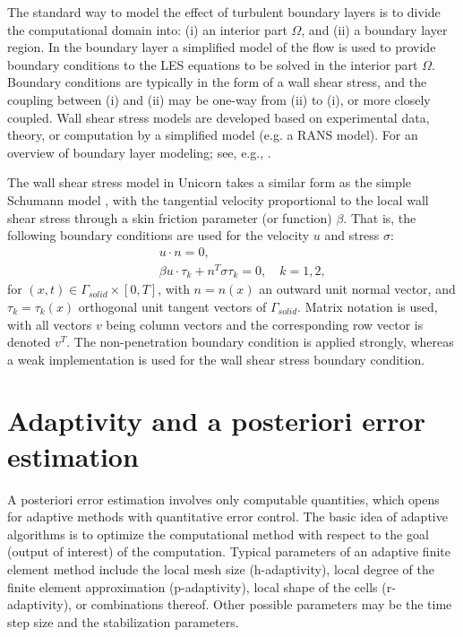The standard way to model the effect of turbulent boundary layers is to divide the computational domain into: (i) an interior part $\Omega$, and (ii) a boundary layer region. In the boundary layer a simplified model of the flow is used to provide boundary conditions to the LES equations to be solved in the interior part $\Omega$. Boundary conditions are typically in the form of a wall shear stress, and the coupling between (i) and (ii) may be one-way from (ii) to (i), or more closely coupled. Wall shear stress models are developed based on experimental data, theory, or computation by a simplified model (e.g. a RANS model). For an overview of boundary layer modeling; see, e.g., \citet{SagautDeckTerracol2006,PiomelliBalaras2002}.

The wall shear stress model in Unicorn takes a similar form as the simple Schumann model \citep{Schumann1975}, with the tangential velocity proportional to the local wall shear stress through a skin friction parameter (or function) $\beta$. That is, the following boundary conditions are used for the velocity $u$ and stress $\sigma$:
\begin{eqnarray}
&&u\cdot n=0, \label{slfra} \\
&&\beta u\cdot \tau _k + n^T\sigma \tau _k=0,\quad k=1,2, \label{slfrb}
\end{eqnarray}
for  $(x,t)\in \Gamma_{solid}\times [0,T]$, with $n=n(x)$ an outward unit normal vector, and $\tau_k=\tau_k(x)$ orthogonal unit tangent vectors of $\Gamma_{solid}$. Matrix notation is used, with all vectors $v$ being column vectors and the corresponding row vector is denoted $v^T$. The non-penetration boundary condition is applied strongly, whereas a weak implementation is used for the wall shear stress boundary condition.

\section{Adaptivity and a posteriori error estimation}

A posteriori error estimation involves only computable quantities, which opens for adaptive methods with quantitative error control. The basic idea of adaptive algorithms is to optimize the computational method with respect to the goal (output of interest) of the computation. Typical parameters of an adaptive finite element method include the local mesh size (h-adaptivity), local degree of the finite element approximation (p-adaptivity), local shape of the cells (r-adaptivity), or combinations thereof. Other possible parameters may be the time step size and the stabilization parameters.

